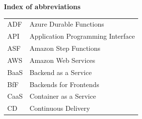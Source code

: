 \documentclass[a4paper,twoside,11pt, pagesize]{scrartcl}
\begin{document}
\begin{spacing}{1.2}
\newpage
{\Large \textbf {Index of abbreviations}}\\
\begin{spacing}{1.07}
\begin{tabular}{ p{2cm} p{10cm}} ADF & Azure Durable Functions \\
  API & Application Programming Interface \\
  ASF & Amazon Step Functions \\
  AWS & Amazon Web Services \\
  BaaS & Backend as a Service \\
  BfF & Backends for Frontends \\
  CaaS & Container as a Service \\
  CD & Continuous Delivery \\

\end{tabular}
\end{spacing}
\end{spacing}
\end{document}
